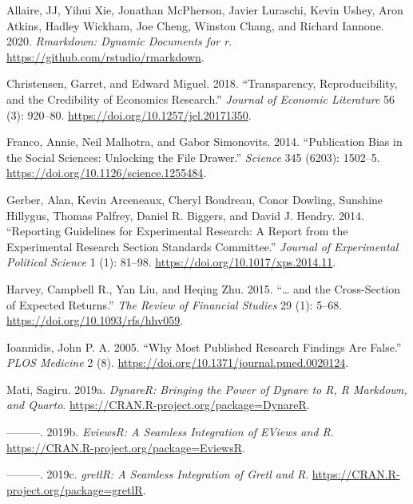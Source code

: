 \hypertarget{refs}{}
\begin{CSLReferences}{1}{0}
\leavevmode{}%
Allaire, JJ, Yihui Xie, Jonathan McPherson, Javier Luraschi, Kevin Ushey, Aron Atkins, Hadley Wickham, Joe Cheng, Winston Chang, and Richard Iannone. 2020. \emph{Rmarkdown: Dynamic Documents for r}. \url{https://github.com/rstudio/rmarkdown}.

\leavevmode{}%
Christensen, Garret, and Edward Miguel. 2018. {``Transparency, Reproducibility, and the Credibility of Economics Research.''} \emph{Journal of Economic Literature} 56 (3): 920--80. \url{https://doi.org/10.1257/jel.20171350}.

\leavevmode{}%
Franco, Annie, Neil Malhotra, and Gabor Simonovits. 2014. {``Publication Bias in the Social Sciences: Unlocking the File Drawer.''} \emph{Science} 345 (6203): 1502--5. \url{https://doi.org/10.1126/science.1255484}.

\leavevmode{}%
Gerber, Alan, Kevin Arceneaux, Cheryl Boudreau, Conor Dowling, Sunshine Hillygus, Thomas Palfrey, Daniel R. Biggers, and David J. Hendry. 2014. {``Reporting Guidelines for Experimental Research: A Report from the Experimental Research Section Standards Committee.''} \emph{Journal of Experimental Political Science} 1 (1): 81--98. \url{https://doi.org/10.1017/xps.2014.11}.

\leavevmode{}%
Harvey, Campbell R., Yan Liu, and Heqing Zhu. 2015. {``{\ldots{} and the Cross-Section of Expected Returns}.''} \emph{The Review of Financial Studies} 29 (1): 5--68. \url{https://doi.org/10.1093/rfs/hhv059}.

\leavevmode{}%
Ioannidis, John P. A. 2005. {``Why Most Published Research Findings Are False.''} \emph{PLOS Medicine} 2 (8). \url{https://doi.org/10.1371/journal.pmed.0020124}.

\leavevmode{}%
Mati, Sagiru. 2019a. \emph{DynareR: Bringing the Power of {Dynare to R, R Markdown, and Quarto}}. \url{https://CRAN.R-project.org/package=DynareR}.

\leavevmode{}%
---------. 2019b. \emph{EviewsR: A Seamless Integration of {EViews} and {R}}. \url{https://CRAN.R-project.org/package=EviewsR}.

\leavevmode{}%
---------. 2019c. \emph{gretlR: A Seamless Integration of {Gretl} and {R}}. \url{https://CRAN.R-project.org/package=gretlR}.


\end{CSLReferences}
